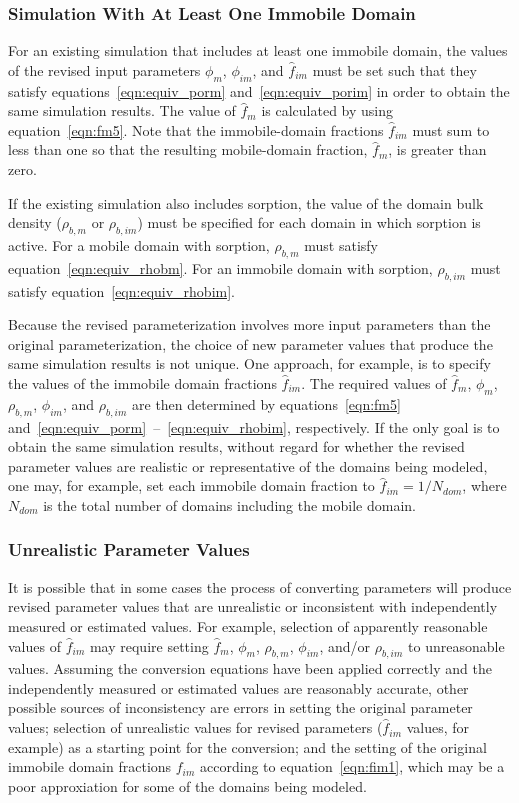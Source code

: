 \subsubsection{Simulation With At Least One Immobile Domain}

For an existing simulation that includes at least one immobile domain, the values of the revised input parameters $\phi_{m}$, $\phi_{im}$, and $\hat{f}_{im}$ must be set such that they satisfy equations~\ref{eqn:equiv_porm} and~\ref{eqn:equiv_porim} in order to obtain the same simulation results. The value of $\hat{f}_{m}$ is calculated by \mf using equation~\ref{eqn:fm5}. Note that the immobile-domain fractions $\hat{f}_{im}$ must sum to less than one so that the resulting mobile-domain fraction, $\hat{f}_{m}$, is greater than zero.

If the existing simulation also includes sorption, the value of the domain bulk density ($\rho_{b, m}$ or $\rho_{b, im}$) must be specified for each domain in which sorption is active. For a mobile domain with sorption, $\rho_{b, m}$ must satisfy equation~\ref{eqn:equiv_rhobm}. For an immobile domain with sorption, $\rho_{b, im}$ must satisfy equation~\ref{eqn:equiv_rhobim}.

Because the revised parameterization involves more input parameters than the original parameterization, the choice of new parameter values that produce the same simulation results is not unique. One approach, for example, is to specify the values of the immobile domain fractions $\hat{f}_{im}$. The required values of $\hat{f}_{m}$, $\phi_{m}$, $\rho_{b, m}$, $\phi_{im}$, and $\rho_{b, im}$ are then determined by equations~\ref{eqn:fm5} and~\ref{eqn:equiv_porm}~--~\ref{eqn:equiv_rhobim}, respectively. If the only goal is to obtain the same simulation results, without regard for whether the revised parameter values are realistic or representative of the domains being modeled, one may, for example, set each immobile domain fraction to $\hat{f}_{im} = 1 / N_{dom}$, where $N_{dom}$ is the total number of domains including the mobile domain.

\subsubsection{Unrealistic Parameter Values}

It is possible that in some cases the process of converting parameters will produce revised parameter values that are unrealistic or inconsistent with independently measured or estimated values. For example, selection of apparently reasonable values of $\hat{f}_{im}$ may require setting $\hat{f}_{m}$, $\phi_{m}$, $\rho_{b, m}$, $\phi_{im}$, and/or $\rho_{b, im}$ to unreasonable values. Assuming the conversion equations have been applied correctly and the independently measured or estimated values are reasonably accurate, other possible sources of inconsistency are errors in setting the original parameter values; selection of unrealistic values for revised parameters ($\hat{f}_{im}$ values, for example) as a starting point for the conversion; and the setting of the original immobile domain fractions $f_{im}$ according to equation~\ref{eqn:fim1}, which may be a poor approxiation for some of the domains being modeled.